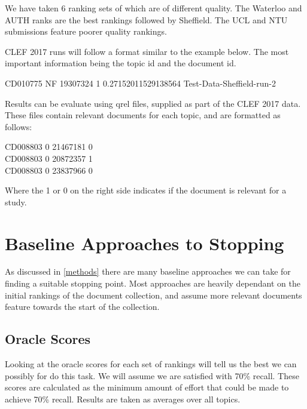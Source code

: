 We have taken 6 ranking sets of which are of different quality. The Waterloo and AUTH ranks are the best rankings followed by Sheffield. The UCL and NTU submissions feature poorer quality rankings.

CLEF 2017 runs will follow a format similar to the example below. The most important information being the topic id and the document id.


\begin{tcolorbox} \label{scoreExample}
CD010775 NF 19307324 1 0.27152011529138564 Test-Data-Sheffield-run-2 
\end{tcolorbox}

Results can be evaluate using qrel files, supplied as part of the CLEF 2017 data. These files contain relevant documents for each topic, and are formatted as follows:

\begin{tcolorbox}
CD008803     0  21467181     0  \\
CD008803     0  20872357     1  \\
CD008803     0  23837966     0 
\end{tcolorbox}

Where the 1 or 0 on the right side indicates if the document is relevant for a study.



\section{Baseline Approaches to Stopping} \label{baselineapp}

As discussed in \ref{methods} there are many baseline approaches we can take for finding a suitable stopping point. Most approaches are heavily dependant on the initial rankings of the document collection, and assume more relevant documents feature towards the start of the collection.

\subsection{Oracle Scores} \label{oracleScores}

Looking at the oracle scores for each set of rankings will tell us the best we can possibly for do this task.  We will assume we are satisfied with 70\% recall. These scores are calculated as the minimum amount of effort that could be made to achieve 70\% recall. Results are taken as averages over all topics.

